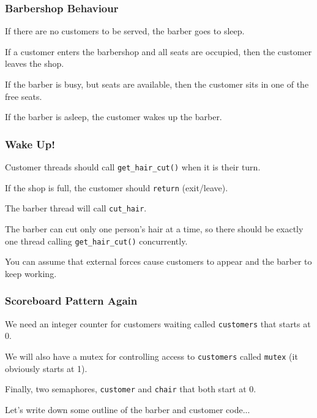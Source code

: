 \begin{frame}
	\frametitle{Barbershop Behaviour}

	If there are no customers to be served, the barber goes to sleep.

	If a customer enters the barbershop and all seats are occupied, then the customer leaves the shop.

	If the barber is busy, but seats are available, then the customer sits in one of the free seats.

	If the barber is asleep, the customer wakes up the barber.

\end{frame}

\begin{frame}
	\frametitle{Wake Up!}

	Customer threads should call \texttt{get\_hair\_cut()} when it is their turn.

	If the shop is full, the customer should \texttt{return} (exit/leave).

	The barber thread will call \texttt{cut\_hair}.

	The barber can cut only one person's hair at a time, so there should be exactly one thread calling \texttt{get\_hair\_cut()} concurrently.

	You can assume that external forces cause customers to appear and the barber to keep working.

\end{frame}


\begin{frame}
	\frametitle{Scoreboard Pattern Again}


	We need an integer counter for customers waiting called \texttt{customers} that starts at 0.

	We will also have a mutex for controlling access to \texttt{customers} called \texttt{mutex} (it obviously starts at 1).

	Finally, two semaphores, \texttt{customer} and \texttt{chair} that both start at 0.

	Let's write down some outline of the barber and customer code...

\end{frame}


